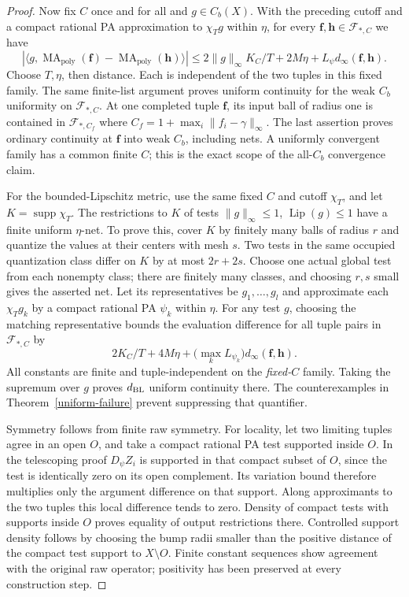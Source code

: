 \documentclass[11pt]{article}
\newcommand{\MA}{\operatorname{MA}_{\mathrm{poly}}}
\begin{document}
\begin{proof}
Now fix $C$ once and for all and $g\in C_b(X)$. With the preceding
cutoff and a compact rational PA approximation to $\chi_Tg$ within
$\eta$, for every $\mathbf f,\mathbf h\in\mathcal F_{*,C}$ we have
\begin{equation}\label{weak-fixed-C}
 |\langle g,\MA(\mathbf f)-\MA(\mathbf h)\rangle|
 \leq2\|g\|_\infty K_C/T+2M\eta+
                          L_\psi d_\infty(\mathbf f,\mathbf h).
\end{equation}
Choose $T,\eta$, then distance. Each is independent of the two tuples
in this fixed family. The same finite-list argument proves uniform
continuity for the weak $C_b$ uniformity on $\mathcal F_{*,C}$.
At one completed tuple $\mathbf f$, its input ball of radius one is
contained in $\mathcal F_{*,C_f}$ where
$C_f=1+\max_i\|f_i-\gamma\|_\infty$.
The last assertion proves ordinary continuity at $\mathbf f$ into
weak $C_b$, including nets. A uniformly convergent family has a common
finite $C$; this is the exact scope of the all-$C_b$ convergence claim.

For the bounded-Lipschitz metric, use the same fixed $C$ and cutoff
$\chi_T$, and let $K=\operatorname{supp}\chi_T$.
The restrictions to $K$ of tests $\|g\|_\infty\leq1$,
$\operatorname{Lip}(g)\leq1$ have a finite uniform $\eta$-net.
To prove this, cover $K$ by finitely many balls of radius $r$ and
quantize the values at their centers with mesh $s$. Two tests in the
same occupied quantization class differ on $K$ by at most $2r+2s$.
Choose one actual global test from each nonempty class; there are finitely
many classes, and choosing $r,s$ small gives the asserted net.
Let its representatives be $g_1,\ldots,g_l$ and approximate each
$\chi_Tg_k$ by a compact rational PA $\psi_k$ within $\eta$.
For any test $g$, choosing the matching representative bounds the
evaluation difference for all tuple pairs in $\mathcal F_{*,C}$ by
\[
 2K_C/T+4M\eta+
       \bigl(\max_k L_{\psi_k}\bigr)d_\infty(\mathbf f,\mathbf h).
\]
All constants are finite and tuple-independent on the \emph{fixed-$C$}
family. Taking the supremum over $g$ proves $d_{\rm BL}$ uniform
continuity there. The counterexamples in Theorem~\ref{uniform-failure}
prevent suppressing that quantifier.

Symmetry follows from finite raw symmetry. For locality, let two limiting
tuples agree in an open $O$, and take a compact rational PA test supported
inside $O$. In the telescoping proof $D_\psi Z_i$ is supported in that
compact subset of $O$, since the test is identically zero on its open
complement. Its variation bound therefore multiplies only the argument
difference on that support. Along approximants to the two tuples this
local difference tends to zero. Density of compact tests with supports
inside $O$ proves equality of output restrictions there. Controlled
support density follows by choosing the bump radii smaller than the
positive distance of the compact test support to $X\setminus O$.
Finite constant sequences show agreement with the original raw operator;
positivity has been preserved at every construction step.


\end{proof}
\end{document}
